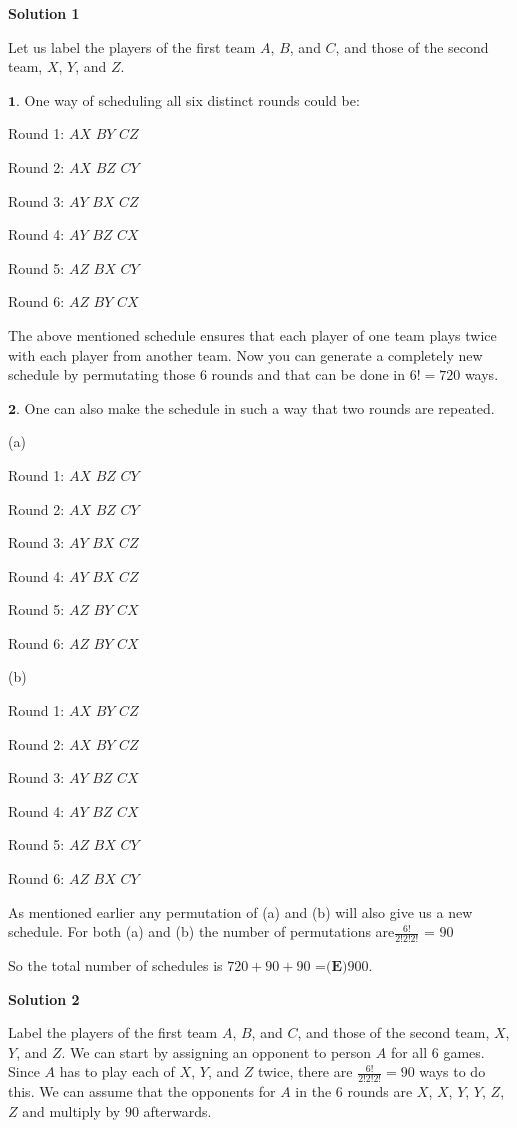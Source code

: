 \begin{enumerate}
\textbf{Solution 1}

Let us label the players of the first team $A$, $B$, and $C$, and those of the second team, $X$, $Y$, and $Z$. 

 $\textbf{1}$. One way of scheduling all six distinct rounds could be:

 Round 1: $AX$ $BY$ $CZ$

 Round 2: $AX$ $BZ$ $CY$

 Round 3: $AY$ $BX$ $CZ$

 Round 4: $AY$ $BZ$ $CX$

 Round 5: $AZ$ $BX$ $CY$

 Round 6: $AZ$ $BY$ $CX$

 
The above mentioned schedule ensures that each player of one team plays twice with each player from another team. Now you can generate a completely new schedule by permutating those $6$ rounds and that can be done in $6!=720$ ways.

 $\textbf{2}$. One can also make the schedule in such a way that two rounds are repeated.  

 (a)

 Round 1: $AX$ $BZ$ $CY$

 Round 2: $AX$ $BZ$ $CY$

 Round 3: $AY$ $BX$ $CZ$

 Round 4: $AY$ $BX$ $CZ$

 Round 5: $AZ$ $BY$ $CX$

 Round 6: $AZ$ $BY$ $CX$

 (b)

 Round 1: $AX$ $BY$ $CZ$

 Round 2: $AX$ $BY$ $CZ$

 Round 3: $AY$ $BZ$ $CX$

 Round 4: $AY$ $BZ$ $CX$

 Round 5: $AZ$ $BX$ $CY$

 Round 6: $AZ$ $BX$ $CY$

 As mentioned earlier any permutation of (a) and (b) will also give us a new schedule. For both (a) and (b) the number of permutations are$\frac{6!}{2!2!2!}$ = $90$

 
So the total number of schedules is $720+90+90$ =$\boxed{\textbf{(E)} 900}$.

 



\textbf{Solution 2}

Label the players of the first team $A$, $B$, and $C$, and those of the second team, $X$, $Y$, and $Z$. We can start by assigning an opponent to person $A$ for all $6$ games. Since $A$ has to play each of $X$, $Y$, and $Z$ twice, there are $\frac{6!}{2!2!2!} = 90$ ways to do this. We can assume that the opponents for $A$ in the $6$ rounds are $X$, $X$, $Y$, $Y$, $Z$, $Z$ and multiply by $90$ afterwards.


\end{enumerate}
